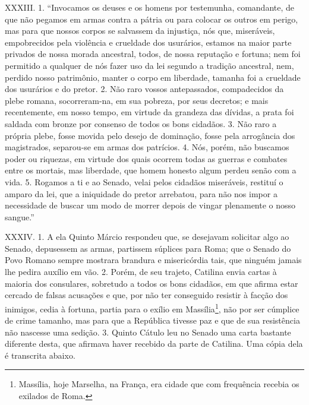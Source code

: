 XXXIII. 1. “Invocamos os deuses e os homens por testemunha, comandante, de que
não pegamos em armas contra a pátria ou para colocar os outros em perigo, mas
para que nossos corpos se salvassem da injustiça, nós que, miseráveis, empobrecidos 
pela violência e crueldade dos usurários, estamos na maior parte privados de
nossa morada ancestral, todos, de nossa reputação e fortuna; nem foi permitido
a qualquer de nós fazer uso da lei segundo a tradição ancestral, nem, perdido
nosso patrimônio, manter o corpo em liberdade, tamanha foi a crueldade dos
usurários e do pretor. 2. Não raro vossos antepassados, compadecidos da plebe
romana, socorreram-na, em sua pobreza, por seus decretos; e mais recentemente,
em nosso tempo, em virtude da grandeza das dívidas, a prata foi saldada com
bronze por consenso de todos os bons cidadãos. 3. Não raro a própria plebe,
fosse movida pelo desejo de dominação, fosse pela arrogância dos magistrados,
separou-se em armas dos patrícios. 4. Nós, porém, não buscamos poder ou
riquezas, em virtude dos quais ocorrem todas as guerras e combates entre os
mortais, mas liberdade, que homem honesto algum perdeu senão com a vida. 5.
Rogamos a ti e ao Senado, velai pelos cidadãos miseráveis, restituí o amparo da
lei, que a iniquidade do pretor arrebatou, para não nos impor a necessidade de
buscar um modo de morrer depois de vingar plenamente o nosso sangue.”

XXXIV. 1. A ela Quinto Márcio respondeu que, se desejavam solicitar algo ao Senado, depusessem as armas, partissem súplices para Roma; que o Senado do Povo
Romano sempre mostrara brandura e misericórdia tais, que ninguém jamais lhe
pedira auxílio em vão. 2. Porém, de seu trajeto, Catilina envia cartas à maioria
dos consulares, sobretudo a todos os bons cidadãos, em que afirma estar
cercado de falsas acusações e que, por não ter conseguido resistir à facção dos
inimigos, cedia à fortuna, partia para o exílio em Massília\footnote{Massília,
hoje Marselha, na França, era cidade que com frequência recebia os exilados de
Roma.}, não por ser cúmplice de crime tamanho, mas para que a República tivesse
paz e que de sua resistência não nascesse uma sedição. 3. Quinto Cátulo leu no
Senado uma carta bastante diferente desta, que afirmava haver recebido da parte
de Catilina. Uma cópia dela é transcrita abaixo.

